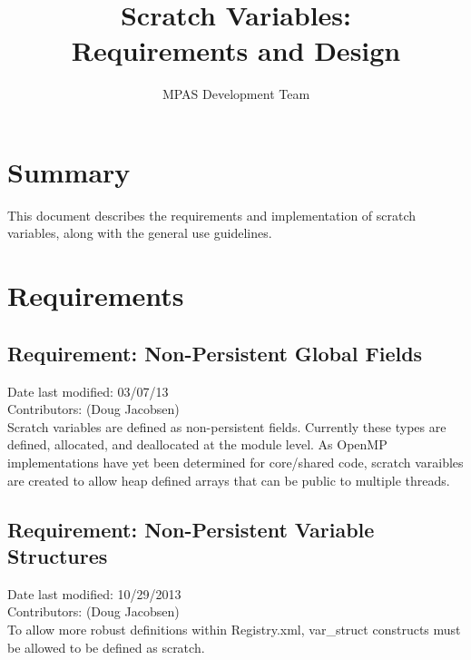 \documentclass[11pt]{report}
\begin{document}
\title{Scratch Variables: \\
Requirements and Design}
\author{MPAS Development Team}

\maketitle
\tableofcontents


\chapter{Summary}


This document describes the requirements and implementation of scratch variables, along with the general use guidelines. 


\chapter{Requirements}

\section{Requirement: Non-Persistent Global Fields}
Date last modified: 03/07/13 \\
Contributors: (Doug Jacobsen) \\

Scratch variables are defined as non-persistent fields. Currently these types
are defined, allocated, and deallocated at the module level. As OpenMP
implementations have yet been determined for core/shared code, scratch
varaibles are created to allow heap defined arrays that can be public to
multiple threads.

\section{Requirement: Non-Persistent Variable Structures}
Date last modified: 10/29/2013 \\
Contributors: (Doug Jacobsen) \\

To allow more robust definitions within Registry.xml, var\_struct constructs
must be allowed to be defined as scratch.

\end{document}
